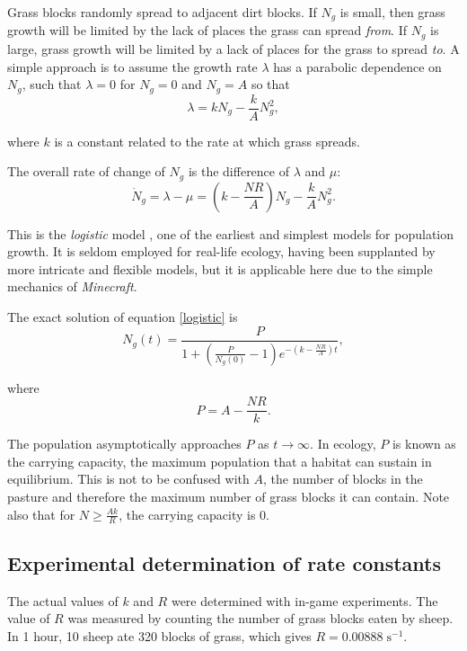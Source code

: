\documentclass{article}
\theoremstyle{theorem}
\theoremstyle{definition}
\begin{document}
Grass blocks randomly spread to adjacent dirt blocks. If $N_g$ is small, then grass growth will be limited by the lack of places the grass can spread \textit{from}. If $N_g$ is large, grass growth will be limited by a lack of places for the grass to spread \textit{to}. A simple approach is to assume the growth rate $\lambda$ has a parabolic dependence on $N_g$, such that $\lambda=0$ for $N_g=0$ and $N_g=A$ so that
\begin{equation}
    \label{growth_rate}
    \lambda=kN_g-\frac{k}{A}N_g^2,
\end{equation}

where $k$ is a constant related to the rate at which grass spreads.

The overall rate of change of $N_g$ is the difference of $\lambda$ and $\mu$:
\begin{equation}
    \label{logistic}
    \dot{N}_g=\lambda-\mu=\left(k-\frac{NR}{A}\right)N_g-\frac{k}{A}N_g^2.
\end{equation}

This is the \textit{logistic} model \cite{banks}, one of the earliest and simplest models for population growth. It is seldom employed for real-life ecology, having been supplanted by more intricate and flexible models, but it is applicable here due to the simple mechanics of \textit{Minecraft}.

The exact solution of equation \ref{logistic} is
\begin{equation}
    \label{logistic_soln}
    N_g(t)=\frac{P}{1+\left(\frac{P}{N_g(0)}-1\right)e^{-\left(k-\frac{NR}{A}\right)t}},
\end{equation}

where
\begin{equation*}
    P=A-\frac{NR}{k}.
\end{equation*}

The population asymptotically approaches $P$ as $t\rightarrow\infty$. In ecology, $P$ is known as the carrying capacity, the maximum population that a habitat can sustain in equilibrium. This is not to be confused with $A$, the number of blocks in the pasture and therefore the maximum number of grass blocks it can contain. Note also that for $N\geq \frac{Ak}{R}$, the carrying capacity is 0.

\subsection{Experimental determination of rate constants}

The actual values of $k$ and $R$ were determined with in-game experiments. The value of $R$ was measured by counting the number of grass blocks eaten by sheep. In 1 hour, 10 sheep ate 320 blocks of grass, which gives $R=0.00888\mathrm{\;s^{-1}}$.
\end{document}
